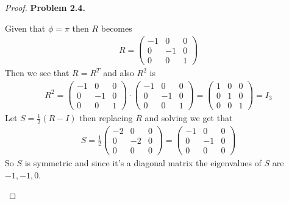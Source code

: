 \documentclass[11pt]{article}
\theoremstyle{definition}
\begin{document}
\begin{proof}{\textbf{Problem 2.4.}}
\begin{itemize}
\begin{itemize}
    Given that $\phi = \pi$ then $R$ becomes
    \begin{align*}
        R = \begin{pmatrix}
            -1 & 0 & 0\\
            0 & -1 & 0\\
            0 & 0 & 1
        \end{pmatrix}
    \end{align*}
    Then we see that $R = R^T$ and also $R^2$ is
    \begin{align*}
        R^2 = \begin{pmatrix}
            -1 & 0 & 0\\
            0 & -1 & 0\\
            0 & 0 & 1
        \end{pmatrix} \cdot \begin{pmatrix}
            -1 & 0 & 0\\
            0 & -1 & 0\\
            0 & 0 & 1
        \end{pmatrix}
         = \begin{pmatrix}
            1 & 0 & 0\\
            0 & 1 & 0\\
            0 & 0 & 1
        \end{pmatrix} = I_3
    \end{align*}
\cleardoublepage
    Let $S = \frac{1}{2}(R - I)$ then replacing $R$ and solving we get that
    \begin{align*}
        S = \frac{1}{2} \begin{pmatrix}
            -2 & 0 & 0 \\
            0 & -2 & 0\\
            0 & 0 & 0
        \end{pmatrix}
        = \begin{pmatrix}
            -1 & 0 & 0 \\
            0 & -1 & 0\\
            0 & 0 & 0
        \end{pmatrix}
    \end{align*}
    So $S$ is symmetric and since it's a diagonal matrix the eigenvalues of $S$
    are $-1, -1, 0$.


\end{itemize}
\end{itemize}
\end{proof}
\end{document}
